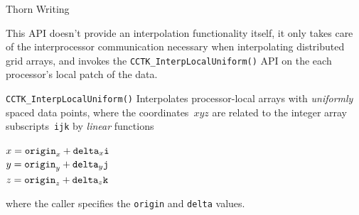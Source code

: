 \begin{cactuspart}{Thorn Writing}
\begin{Lentry}
        This API doesn't provide an interpolation functionality itself,
        it only takes care of the interprocessor communication
        necessary when interpolating distributed grid arrays, and invokes
        the \texttt{CCTK\_InterpLocalUniform()} API on the each processor's
        local patch of the data.
\item[\texttt{CCTK\_InterpLocalUniform()}]
        Interpolates processor-local arrays with \emph{uniformly}
        spaced data points, \ie{} where the coordinates~$xyz$
        are related to the integer array subscripts~\verb|ijk| by
        \emph{linear} functions
        \begin{flushleft}
        $x = \verb|origin|_x + \verb|delta|_x \verb|i|$ \\
        $y = \verb|origin|_y + \verb|delta|_y \verb|j|$ \\
        $z = \verb|origin|_z + \verb|delta|_z \verb|k|$ %
        \end{flushleft}
        where the caller specifies the \verb|origin| and \verb|delta|
        values.
\end{Lentry}


\end{cactuspart}
